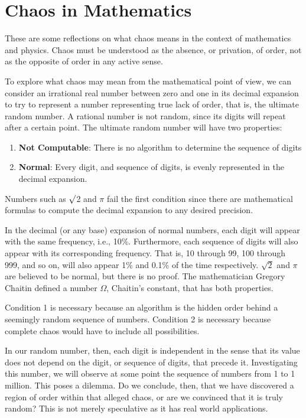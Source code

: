 \section{Chaos in Mathematics}


\hfill

These are some reflections on what chaos means in the context of mathematics and physics. Chaos must be understood as
the absence, or privation, of order, not as the opposite of order in any active sense.

To explore what chaos may mean from the mathematical point of view, we can consider an irrational real number between
zero and one in its decimal expansion to try to represent a number representing true lack of order, that is, the
ultimate random number. A rational number is not random, since its digits will repeat after a certain point. The
ultimate random number will have two properties:

\begin{enumerate}
\item \textbf{Not Computable}: There is no algorithm to determine the sequence of digits 
\item \textbf{Normal}: Every digit, and sequence of digits, is evenly represented in the decimal expansion. 
\end{enumerate}
Numbers such as ${\surd}$2 and $\pi $ fail the first condition since there are mathematical formulas to compute the
decimal expansion to any desired precision.

In the decimal (or any base) expansion of normal numbers, each digit will appear with the same frequency, i.e., 10\%.
Furthermore, each sequence of digits will also appear with its corresponding frequency. That is, 10 through 99, 100
through 999, and so on, will also appear 1\% and 0.1\% of the time respectively. $\sqrt 2$ and $\pi $ are believed to
be normal, but there is no proof. The mathematician Gregory Chaitin defined a number $\Omega $,
Chaitin's constant, that has both properties.

Condition 1 is necessary because an algorithm is the hidden order behind a seemingly random sequence of numbers.
Condition 2 is necessary because complete chaos would have to include all possibilities.

In our random number, then, each digit is independent in the sense that its value does not depend on the digit, or
sequence of digits, that precede it. Investigating this number, we will observe at some point the sequence of numbers
from 1 to 1 million. This poses a dilemma. Do we conclude, then, that we have discovered a region of order within that
alleged chaos, or are we convinced that it is truly random? This is not merely speculative as it has real world
applications.

